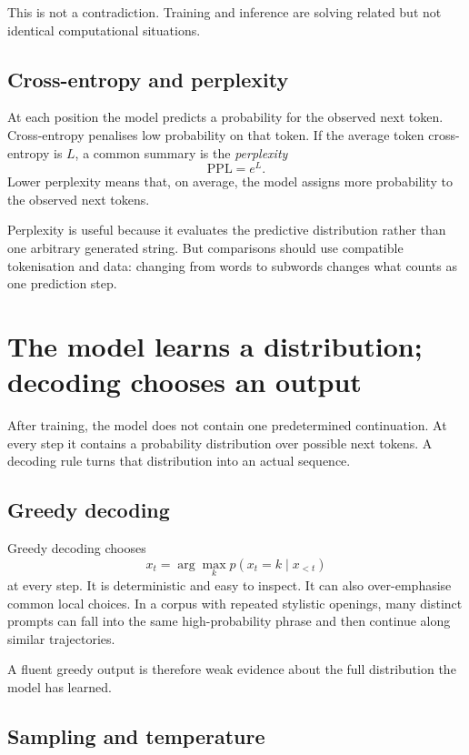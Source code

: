 This is not a contradiction. Training and inference are solving related but not identical computational situations.

\subsection{Cross-entropy and perplexity}

At each position the model predicts a probability for the observed next token. Cross-entropy penalises low probability on that token. If the average token cross-entropy is \(L\), a common summary is the \emph{perplexity}
\begin{equation}
  \mathrm{PPL} = e^L.
\end{equation}
Lower perplexity means that, on average, the model assigns more probability to the observed next tokens.

Perplexity is useful because it evaluates the predictive distribution rather than one arbitrary generated string. But comparisons should use compatible tokenisation and data: changing from words to subwords changes what counts as one prediction step.

\section{The model learns a distribution; decoding chooses an output}

After training, the model does not contain one predetermined continuation. At every step it contains a probability distribution over possible next tokens. A decoding rule turns that distribution into an actual sequence.

\subsection{Greedy decoding}

Greedy decoding chooses
\[
  x_t = \arg\max_k p(x_t=k\mid x_{<t})
\]
at every step. It is deterministic and easy to inspect. It can also over-emphasise common local choices. In a corpus with repeated stylistic openings, many distinct prompts can fall into the same high-probability phrase and then continue along similar trajectories.

A fluent greedy output is therefore weak evidence about the full distribution the model has learned.

\subsection{Sampling and temperature}

